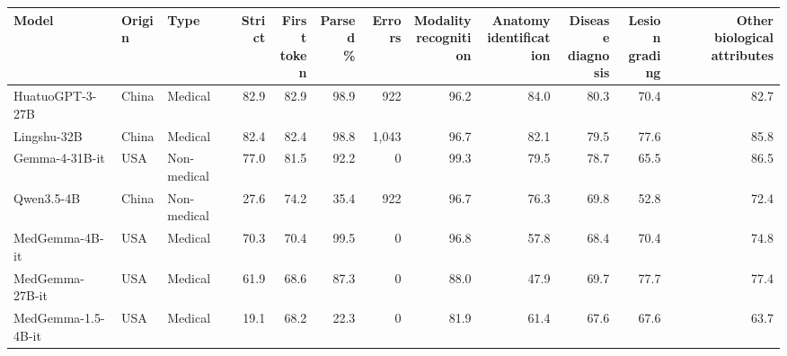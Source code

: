 \begin{tabular}{@{}lllrrrrrrrrr@{}}
\toprule
Model & Origin & Type & Strict & \thead{First\\token} & \thead{Parsed\\\%} & Errors & \thead{Modality\\recognition} & \thead{Anatomy\\identification} & \thead{Disease\\diagnosis} & \thead{Lesion\\grading} & \thead{Other\\biological attributes} \\
\midrule
HuatuoGPT-3-27B & China & Medical & 82.9 & 82.9 & 98.9 & 922 & 96.2 & 84.0 & 80.3 & 70.4 & 82.7 \\
Lingshu-32B & China & Medical & 82.4 & 82.4 & 98.8 & 1,043 & 96.7 & 82.1 & 79.5 & 77.6 & 85.8 \\
Gemma-4-31B-it & USA & Non-medical & 77.0 & 81.5 & 92.2 & 0 & 99.3 & 79.5 & 78.7 & 65.5 & 86.5 \\
Qwen3.5-4B & China & Non-medical & 27.6 & 74.2 & 35.4 & 922 & 96.7 & 76.3 & 69.8 & 52.8 & 72.4 \\
MedGemma-4B-it & USA & Medical & 70.3 & 70.4 & 99.5 & 0 & 96.8 & 57.8 & 68.4 & 70.4 & 74.8 \\
MedGemma-27B-it & USA & Medical & 61.9 & 68.6 & 87.3 & 0 & 88.0 & 47.9 & 69.7 & 77.7 & 77.4 \\
MedGemma-1.5-4B-it & USA & Medical & 19.1 & 68.2 & 22.3 & 0 & 81.9 & 61.4 & 67.6 & 67.6 & 63.7 \\
\bottomrule
\end{tabular}
